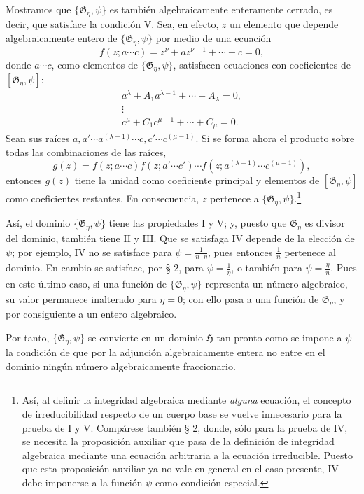 Mostramos que $\{\mathfrak G_\eta,\psi\}$ es también algebraicamente enteramente cerrado, es decir, que satisface la condición V. Sea, en efecto, $z$ un elemento que depende algebraicamente entero de $\{\mathfrak G_\eta,\psi\}$ por medio de una ecuación
\[
 f(z;a\cdots c)=z^\nu+a z^{\nu-1}+\cdots+c=0,
\]
donde $a\cdots c$, como elementos de $\{\mathfrak G_\eta,\psi\}$, satisfacen ecuaciones con coeficientes de $[\mathfrak G_\eta,\psi]$:
\[
\begin{gathered}
 a^\lambda+A_1a^{\lambda-1}+\cdots+A_\lambda=0,\\
 \vdots\\
 c^\mu+C_1c^{\mu-1}+\cdots+C_\mu=0.
\end{gathered}
\]
Sean sus raíces
$a,a'\cdots a^{(\lambda-1)}\cdots c,c'\cdots c^{(\mu-1)}$. Si se forma ahora el producto sobre todas las combinaciones de las raíces,
\[
 g(z)=f(z;a\cdots c)f(z;a'\cdots c')\cdots
      f(z;a^{(\lambda-1)}\cdots c^{(\mu-1)}),
\]
entonces $g(z)$ tiene la unidad como coeficiente principal y elementos de $[\mathfrak G_\eta,\psi]$ como coeficientes restantes. En consecuencia, $z$ pertenece a $\{\mathfrak G_\eta,\psi\}$.\footnote{Así, al definir la integridad algebraica mediante \emph{alguna} ecuación, el concepto de irreducibilidad respecto de un cuerpo base se vuelve innecesario para la prueba de I y V. Compárese también § 2, donde, sólo para la prueba de IV, se necesita la proposición auxiliar que pasa de la definición de integridad algebraica mediante una ecuación arbitraria a la ecuación irreducible. Puesto que esta proposición auxiliar ya no vale en general en el caso presente, IV debe imponerse a la función $\psi$ como condición especial.}

Así, el dominio $\{\mathfrak G_\eta,\psi\}$ tiene las propiedades I y V; y, puesto que $\mathfrak G_\eta$ es divisor del dominio, también tiene II y III. Que se satisfaga IV depende de la elección de $\psi$; por ejemplo, IV no se satisface para $\psi=\frac{1}{n\cdot\eta}$, pues entonces $\frac1n$ pertenece al dominio. En cambio se satisface, por § 2, para $\psi=\frac1\eta$, o también para $\psi=\frac{\eta}{n}$. Pues en este último caso, si una función de $\{\mathfrak G_\eta,\psi\}$ representa un número algebraico, su valor permanece inalterado para $\eta=0$; con ello pasa a una función de $\mathfrak G_\eta$, y por consiguiente a un entero algebraico.

Por tanto, $\{\mathfrak G_\eta,\psi\}$ se convierte en un dominio $\mathfrak H$ tan pronto como se impone a $\psi$ la condición de que por la adjunción algebraicamente entera no entre en el dominio ningún número algebraicamente fraccionario.

